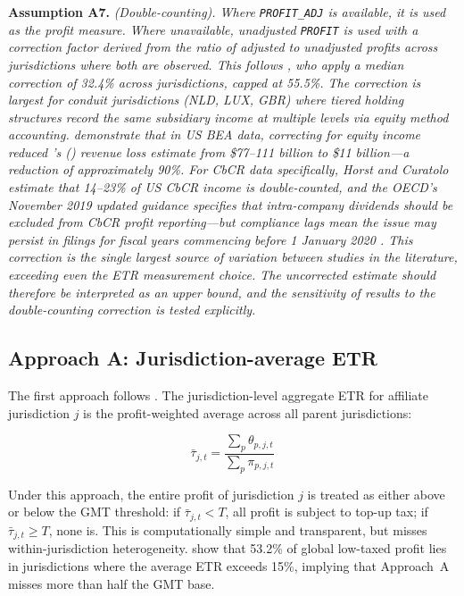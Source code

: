 \documentclass[11pt,a4paper]{article}
\newcommand{\code}[1]{\texttt{#1}}
\newcommand{\assumption}[2]{\noindent\textbf{Assumption #1.} \textit{#2}\medskip}
\begin{document}
\assumption{A7}{(Double-counting). Where \code{PROFIT\_ADJ} is available, it is used as the profit measure. Where unavailable, unadjusted \code{PROFIT} is used with a correction factor derived from the ratio of adjusted to unadjusted profits across jurisdictions where both are observed. This follows \citet{hugger2025}, who apply a median correction of 32.4\% across jurisdictions, capped at 55.5\%. The correction is largest for conduit jurisdictions (NLD, LUX, GBR) where tiered holding structures record the same subsidiary income at multiple levels via equity method accounting. \citet{blouin2023} demonstrate that in US BEA data, correcting for equity income reduced \citeauthor{clausing2016}'s (\citeyear{clausing2016}) revenue loss estimate from \$77--111 billion to \$11 billion---a reduction of approximately 90\%. For CbCR data specifically, Horst and Curatolo estimate that 14--23\% of US CbCR income is double-counted, and the OECD's November 2019 updated guidance specifies that intra-company dividends should be excluded from CbCR profit reporting---but compliance lags mean the issue may persist in filings for fiscal years commencing before 1 January 2020 \citep{oecd2025corptaxstats}. This correction is the single largest source of variation between studies in the literature, exceeding even the ETR measurement choice. The uncorrected estimate should therefore be interpreted as an upper bound, and the sensitivity of results to the double-counting correction is tested explicitly.}

\subsection{Approach A: Jurisdiction-average ETR}\label{sec:approach_a}

The first approach follows \citet{barake2022}. The jurisdiction-level aggregate ETR for affiliate jurisdiction $j$ is the profit-weighted average across all parent jurisdictions:

\begin{equation}\label{eq:etr_agg}
\bar{\tau}_{j,t} = \frac{\sum_p \theta_{p,j,t}}{\sum_p \pi_{p,j,t}}
\end{equation}

Under this approach, the entire profit of jurisdiction $j$ is treated as either above or below the GMT threshold: if $\bar{\tau}_{j,t} < T$, all profit is subject to top-up tax; if $\bar{\tau}_{j,t} \geq T$, none is. This is computationally simple and transparent, but misses within-jurisdiction heterogeneity. \citet{hugger2025} show that 53.2\% of global low-taxed profit lies in jurisdictions where the average ETR exceeds 15\%, implying that Approach~A misses more than half the GMT base.
\end{document}
